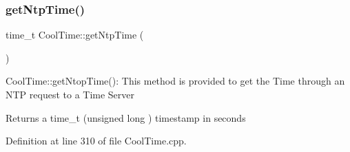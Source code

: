 \subsubsection{\texorpdfstring{get\+Ntp\+Time()}{getNtpTime()}}
{\footnotesize\ttfamily time\+\_\+t Cool\+Time\+::get\+Ntp\+Time (\begin{DoxyParamCaption}{ }\end{DoxyParamCaption})}

Cool\+Time\+::get\+Ntop\+Time()\+: This method is provided to get the Time through an N\+TP request to a Time Server

\begin{DoxyReturn}{Returns}
a time\+\_\+t (unsigned long ) timestamp in seconds 
\end{DoxyReturn}


Definition at line 310 of file Cool\+Time.\+cpp.


